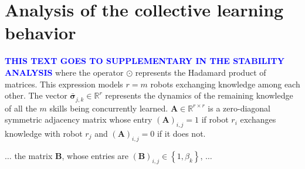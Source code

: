 \newpage
\section{Analysis of the collective learning behavior}\label{sec:collective_learning_analysis}

\textcolor{blue}{\textbf{THIS TEXT GOES TO SUPPLEMENTARY IN THE STABILITY ANALYSIS}} where the operator $\odot$ represents the Hadamard product of matrices. This expression models $r=m$ robots exchanging knowledge among each other. The vector $\bar{\bm{\sigma}}^{}_{j,k} \in \mathbb{R}^r$ represents the dynamics of the remaining knowledge of all the $m$ skills being concurrently learned. $\bm{A} \in \mathbb{R}^{r \times r}$ is a zero-diagonal symmetric adjacency matrix whose entry $(\bm{A})_{i,j} = 1$ if robot $r_i$ exchanges knowledge with robot $r_j$ and $(\bm{A})_{i,j} = 0$ if it does not.

$\ldots$ the matrix $\bm{B}$, whose entries are $\left(\bm{B}\right)_{i,j} \in \left \lbrace 1, \beta_{k} \right \rbrace$, $\ldots$


